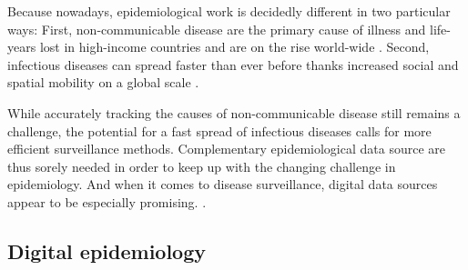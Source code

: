 \documentclass[11pt, a4paper]{report}\usepackage[]{graphicx}\usepackage[]{color}
\begin{document}
Because nowadays, epidemiological work is decidedly different in two particular ways: First, non-communicable disease are the primary cause of illness and life-years lost in high-income countries and are on the rise world-wide \citep{lozano_global_2013}. Second, infectious diseases can spread faster than ever before thanks increased social and spatial mobility on a global scale \citep{hufnagel_forecast_2004}.

While accurately tracking the causes of non-communicable disease still remains a challenge, the potential for a fast spread of infectious diseases calls for more efficient surveillance methods. Complementary epidemiological data source are thus sorely needed in order to keep up with the changing challenge in epidemiology. And when it comes to disease surveillance, digital data sources appear to be especially promising. \citep{salathe_digital_2012, simonsen_infectious_2016}.

\subsection{Digital epidemiology}
\end{document}
